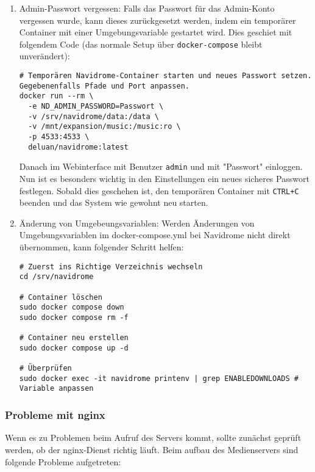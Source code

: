 \documentclass[12pt,a4paper]{report}
\begin{document}
\begin{enumerate}
      \item Admin-Passwort vergessen:  
      Falls das Passwort für das Admin-Konto vergessen wurde, kann dieses zurückgesetzt werden, indem ein temporärer Container mit einer Umgebungsvariable gestartet wird.  
      Dies geschiet mit folgendem Code (das normale Setup über \texttt{docker-compose} bleibt unverändert):

      \begin{verbatim}
# Temporären Navidrome-Container starten und neues Passwort setzen. Gegebenenfalls Pfade und Port anpassen.
docker run --rm \
  -e ND_ADMIN_PASSWORD=Passwort \
  -v /srv/navidrome/data:/data \
  -v /mnt/expansion/music:/music:ro \
  -p 4533:4533 \
  deluan/navidrome:latest
      \end{verbatim}

      Danach im Webinterface mit Benutzer \texttt{admin} und mit "Passwort" einloggen. Nun ist es besonders wichtig in den Einstellungen ein neues sicheres Passwort festlegen.  
      Sobald dies geschehen ist, den temporären Container mit \texttt{CTRL+C} beenden und das System wie gewohnt neu starten.
    
      \item Änderung von Umgebeungsvariablen:
      Werden Änderungen von Umgebungsvariablen im docker-compose.yml bei Navidrome nicht direkt übernommen, kann folgender Schritt helfen:
      \begin{verbatim}
# Zuerst ins Richtige Verzeichnis wechseln
cd /srv/navidrome

# Container löschen
sudo docker compose down
sudo docker compose rm -f

# Container neu erstellen
sudo docker compose up -d

# Überprüfen
sudo docker exec -it navidrome printenv | grep ENABLEDOWNLOADS # Variable anpassen
      \end{verbatim}
    \end{enumerate}

    \subsubsection*{Probleme mit nginx}
    Wenn es zu Problemen beim Aufruf des Servers kommt, sollte zunächst geprüft werden, ob der nginx-Dienst richtig läuft.
    Beim aufbau des Medienservers sind folgende Probleme aufgetreten:
    
\end{document}
